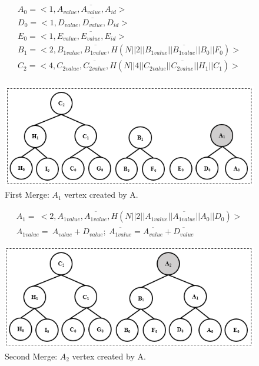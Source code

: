 		\begin{equation*}
			\begin{array}{l}
				A_{0} = <1, A_{value}, \overline{A_{value}}, A_{id}>\\
				D_{0} = <1, D_{value}, \overline{D_{value}}, D_{id}>\\
				E_{0} = <1, E_{value}, \overline{E_{value}}, E_{id}>\\
				B_{1} = <2, B_{1value}, \overline{B_{1value}}, H(N || 2 || B_{1value} || \overline{B_{1value}} || B_{0} || F_{0})>\\
				C_{2} = <4, C_{2value}, \overline{C_{2value}}, H(N || 4 || C_{2value} || \overline{C_{2value}} || H_{1} || C_{1})>\\
			\end{array}
		\end{equation*}
		\begin{figure}[h!]
			\centering
			\includegraphics{images/commitment-tree-example-2-shia.png}
			\caption{First Merge: $A_{1}$ vertex created by A.}
			\label{fig:commitment-tree-example-2-shia}
		\end{figure}
		\begin{equation*}
			\begin{array}{l}
				A_{1} =\  < 2, A_{1value}, \overline{A_{1value}}, H(N || 2 || A_{1value}|| \overline{A_{1value}} || A_{0} || D_{0})>\\
				A_{1value} =\  A_{value} + D_{value};\ \overline{A_{1value}} = \overline{A_{value}} + \overline{D_{value}}
			\end{array}
		\end{equation*}
		\begin{figure}[h!]
			\centering
			\includegraphics{images/commitment-tree-example-3-shia.png}
			\caption{Second Merge: $A_{2}$ vertex created by A.}
			\label{fig:commitment-tree-example-3-shia}
		\end{figure}
